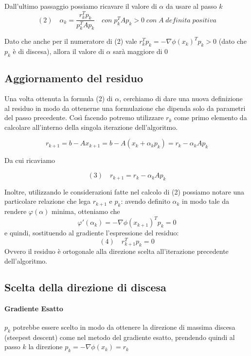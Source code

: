 Dall'ultimo passaggio possiamo ricavare il valore di $\alpha$ da usare
al passo $k$
$$(2) \quad \alpha_{k} = \frac{ r_{k}^{T} p_{k}}{p_{k}^{T} A p_{k}} \quad con \;p_{k}^{T}Ap_{k} > 0 \;con\; A\; definita\; positiva $$

Dato che anche per il numeratore di (2) vale $ r_{k}^{T} p_{k} =
-\nabla \phi(x_{k})^{T} p_{k} > 0 $ (dato che $p_{k}$ \`e di discesa),
allora il valore di $\alpha$ sarà maggiore di 0

\subsection{Aggiornamento del residuo}

Una volta ottenuta la formula (2) di $\alpha$, cerchiamo di dare una
nuova definizione al residuo in modo da ottenerne una formulazione che
dipenda solo da parametri del passo precedente. Così facendo potremo
utilizzare $r_{k}$ come primo elemento da calcolare all'interno della
singola iterazione dell'algoritmo.

$$ r_{k+1} = b-A x_{k+1} = b-A(x_{k} + \alpha_{k} p_{k}) = r_{k}  - \alpha_{k} A p_{k}$$

Da cui ricaviamo

$$ (3) \quad r_{k+1} = r_{k} - \alpha_{k} A p_{k}$$

Inoltre, utilizzando le considerazioni fatte nel calcolo di (2)
possiamo notare una particolare relazione che lega $r_{k+1}$ e
$p_{k}$: avendo definito $\alpha_{k}$ in modo tale da rendere
$\varphi(\alpha)$ minima, otteniamo che
$$  \varphi'(\alpha_{k}) = -\nabla \phi(x_{k+1})^{T} p_{k} = 0$$
e quindi, sostituendo al gradiente l'espressione del residuo:
$$(4) \quad r_{k+1}^{T} p_{k} = 0$$
Ovvero il residuo \`e ortogonale alla direzione scelta all'iterazione
precedente dell'algoritmo.

\subsection{Scelta della direzione di discesa}
\paragraph{Gradiente Esatto}
$p_{k}$ potrebbe essere
scelto in modo da ottenere la direzione di massima discesa (steepest
descent) come nel metodo del gradiente esatto, prendendo quindi al
passo $k$ la direzione $p_{k} = - \nabla \phi(x_{k}) = r_{k}$

